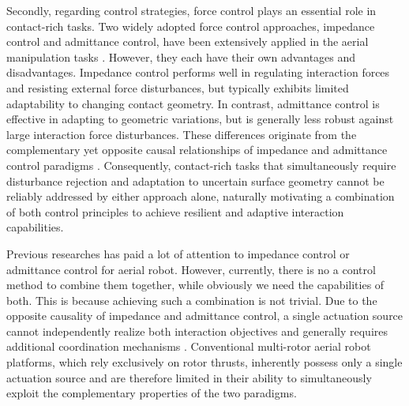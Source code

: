 





Secondly, regarding control strategies, force control plays an essential role in contact-rich tasks. Two widely adopted force control approaches, impedance control and admittance control, have been extensively applied in the aerial manipulation tasks \cite{ollero_2021_past}. However, they each have their own advantages and disadvantages. Impedance control performs well in regulating interaction forces and resisting external force disturbances, but typically exhibits limited adaptability to changing contact geometry. In contrast, admittance control is effective in adapting to geometric variations, but is generally less robust against large interaction force disturbances. These differences originate from the complementary yet opposite causal relationships of impedance and admittance control paradigms \cite{ott_2010_unified}. Consequently, contact-rich tasks that simultaneously require disturbance rejection and adaptation to uncertain surface geometry cannot be reliably addressed by either approach alone, naturally motivating a combination of both control principles to achieve resilient and adaptive interaction capabilities.

Previous researches has paid a lot of attention to impedance control or admittance control for aerial robot. However, currently, there is no a control method to combine them together, while obviously we need the capabilities of both. This is because achieving such a combination is not trivial. Due to the opposite causality of impedance and admittance control, a single actuation source cannot independently realize both interaction objectives and generally requires additional coordination mechanisms \cite{ott_2010_unified}. Conventional multi-rotor aerial robot platforms, which rely exclusively on rotor thrusts, inherently possess only a single actuation source and are therefore limited in their ability to simultaneously exploit the complementary properties of the two paradigms.

